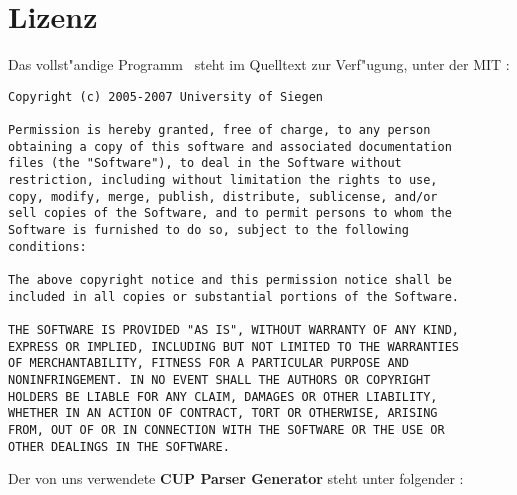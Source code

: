 
\chapter{Lizenz}

Das vollst"andige Programm \TPML\ steht im Quelltext zur Verf"ugung,
unter der MIT :
\begin{verbatim}
Copyright (c) 2005-2007 University of Siegen

Permission is hereby granted, free of charge, to any person
obtaining a copy of this software and associated documentation
files (the "Software"), to deal in the Software without
restriction, including without limitation the rights to use,
copy, modify, merge, publish, distribute, sublicense, and/or
sell copies of the Software, and to permit persons to whom the
Software is furnished to do so, subject to the following
conditions:

The above copyright notice and this permission notice shall be
included in all copies or substantial portions of the Software.

THE SOFTWARE IS PROVIDED "AS IS", WITHOUT WARRANTY OF ANY KIND,
EXPRESS OR IMPLIED, INCLUDING BUT NOT LIMITED TO THE WARRANTIES
OF MERCHANTABILITY, FITNESS FOR A PARTICULAR PURPOSE AND
NONINFRINGEMENT. IN NO EVENT SHALL THE AUTHORS OR COPYRIGHT
HOLDERS BE LIABLE FOR ANY CLAIM, DAMAGES OR OTHER LIABILITY,
WHETHER IN AN ACTION OF CONTRACT, TORT OR OTHERWISE, ARISING
FROM, OUT OF OR IN CONNECTION WITH THE SOFTWARE OR THE USE OR
OTHER DEALINGS IN THE SOFTWARE.
\end{verbatim}

Der von uns verwendete {\bf CUP Parser Generator} steht unter folgender :

